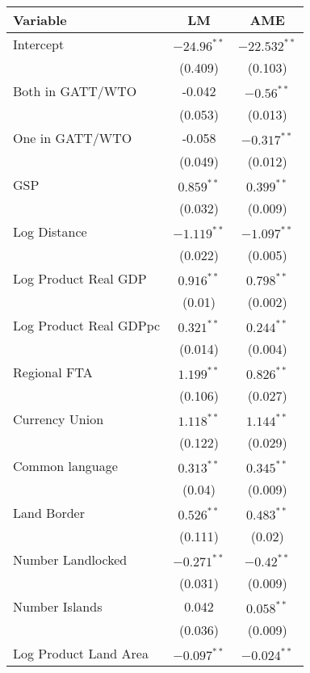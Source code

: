 \begin{table}[ht]
\centering
\begingroup\normalsize
\begin{tabular}{lcc}
 Variable & LM & AME \\ 
  \hline
\hline
Intercept & $-24.96^{\ast\ast}$ & $-22.532^{\ast\ast}$ \\ 
   & (0.409) & (0.103) \\ 
  Both in GATT/WTO & -0.042 & $-0.56^{\ast\ast}$ \\ 
   & (0.053) & (0.013) \\ 
  One in GATT/WTO & -0.058 & $-0.317^{\ast\ast}$ \\ 
   & (0.049) & (0.012) \\ 
  GSP & $0.859^{\ast\ast}$ & $0.399^{\ast\ast}$ \\ 
   & (0.032) & (0.009) \\ 
  Log Distance & $-1.119^{\ast\ast}$ & $-1.097^{\ast\ast}$ \\ 
   & (0.022) & (0.005) \\ 
  Log Product Real GDP & $0.916^{\ast\ast}$ & $0.798^{\ast\ast}$ \\ 
   & (0.01) & (0.002) \\ 
  Log Product Real GDPpc & $0.321^{\ast\ast}$ & $0.244^{\ast\ast}$ \\ 
   & (0.014) & (0.004) \\ 
  Regional FTA & $1.199^{\ast\ast}$ & $0.826^{\ast\ast}$ \\ 
   & (0.106) & (0.027) \\ 
  Currency Union & $1.118^{\ast\ast}$ & $1.144^{\ast\ast}$ \\ 
   & (0.122) & (0.029) \\ 
  Common language & $0.313^{\ast\ast}$ & $0.345^{\ast\ast}$ \\ 
   & (0.04) & (0.009) \\ 
  Land Border & $0.526^{\ast\ast}$ & $0.483^{\ast\ast}$ \\ 
   & (0.111) & (0.02) \\ 
  Number Landlocked & $-0.271^{\ast\ast}$ & $-0.42^{\ast\ast}$ \\ 
   & (0.031) & (0.009) \\ 
  Number Islands & 0.042 & $0.058^{\ast\ast}$ \\ 
   & (0.036) & (0.009) \\ 
  Log Product Land Area & $-0.097^{\ast\ast}$ & $-0.024^{\ast\ast}$ \\ 

\end{tabular}
\end{table}
